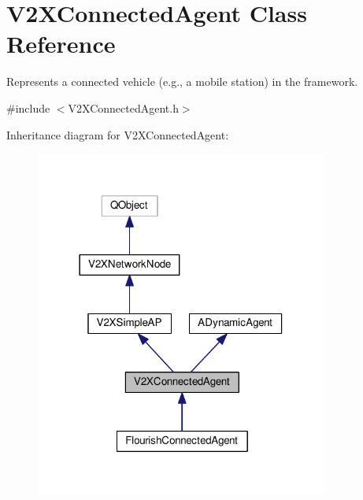 \hypertarget{classV2XConnectedAgent}{}\section{V2\+X\+Connected\+Agent Class Reference}
\label{classV2XConnectedAgent}


Represents a connected vehicle (e.\+g., a mobile station) in the framework.  




{\ttfamily \#include $<$V2\+X\+Connected\+Agent.\+h$>$}



Inheritance diagram for V2\+X\+Connected\+Agent\+:\nopagebreak
\begin{figure}[H]
\begin{center}
\leavevmode
\includegraphics[width=273pt]{classV2XConnectedAgent__inherit__graph}
\end{center}
\end{figure}



